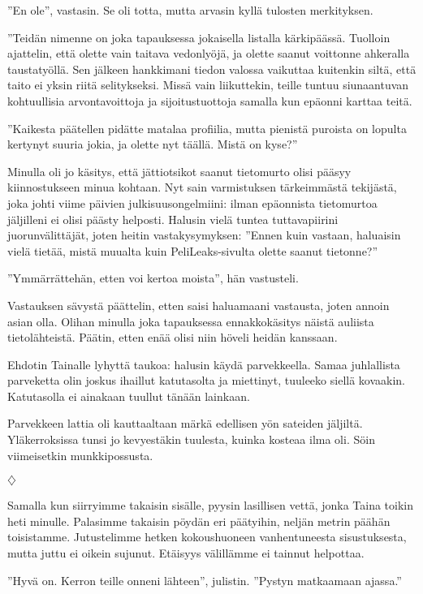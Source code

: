 ﻿\documentclass[a4paper, 12pt, finnish]{article}
\newcommand{\q}[1]{''#1''}
\newcommand{\openq}[1]{''#1} %
\def\jump{\vspace{2mm} \centerline{$\diamondsuit$} \vspace{2mm}}
\begin{document}
\q{En ole}, vastasin. Se oli totta, mutta arvasin kyllä tulosten merkityksen.

\openq{Teidän nimenne on joka tapauksessa jokaisella listalla kärkipäässä.
Tuolloin ajattelin, että olette vain taitava vedonlyöjä, ja olette
saanut voittonne ahkeralla taustatyöllä. Sen jälkeen hankkimani
tiedon valossa vaikuttaa kuitenkin siltä, että taito ei yksin riitä
selitykseksi. Missä vain liikuttekin, teille tuntuu siunaantuvan kohtuullisia 
arvontavoittoja ja sijoitustuottoja samalla kun epäonni karttaa teitä.}

\q{Kaikesta päätellen pidätte matalaa profiilia, mutta pienistä
puroista on lopulta kertynyt suuria jokia, ja olette nyt täällä.
Mistä on kyse?}

Minulla oli jo käsitys, että jättiotsikot saanut tietomurto
olisi pääsyy kiinnostukseen minua kohtaan. Nyt sain varmistuksen
tärkeimmästä tekijästä, joka johti viime päivien
julkisuusongelmiini: ilman epäonnista tietomurtoa jäljilleni ei olisi
päästy helposti. Halusin vielä tuntea tuttavapiirini
juorunvälittäjät, joten heitin vastakysymyksen:
\q{Ennen kuin vastaan, haluaisin vielä tietää,
mistä muualta kuin PeliLeaks-sivulta olette saanut tietonne?}

\q{Ymmärrättehän, etten voi kertoa moista}, hän vastusteli.

Vastauksen sävystä päättelin, etten saisi haluamaani vastausta,
joten annoin asian olla.
Olihan minulla joka tapauksessa ennakkokäsitys näistä auliista
tietolähteistä. Päätin, etten enää olisi niin höveli heidän kanssaan.

Ehdotin Tainalle lyhyttä taukoa: halusin käydä parvekkeella. Samaa
juhlallista parveketta olin joskus ihaillut katutasolta
ja miettinyt, tuuleeko siellä kovaakin. Katutasolla ei ainakaan
tuullut tänään lainkaan.

Parvekkeen lattia oli kauttaaltaan märkä edellisen yön sateiden
jäljiltä. Yläkerroksissa tunsi jo kevyestäkin tuulesta, kuinka
kosteaa ilma oli. Söin viimeisetkin munkkipossusta.


\jump


Samalla kun siirryimme takaisin sisälle, pyysin lasillisen vettä,
jonka Taina toikin heti minulle. Palasimme takaisin pöydän eri
päätyihin, neljän metrin päähän toisistamme.
Jutustelimme hetken kokoushuoneen vanhentuneesta sisustuksesta,
mutta juttu ei oikein sujunut. Etäisyys välillämme ei tainnut helpottaa.

\q{Hyvä on. Kerron teille onneni lähteen}, julistin.
\q{Pystyn matkaamaan ajassa.}
\end{document}
